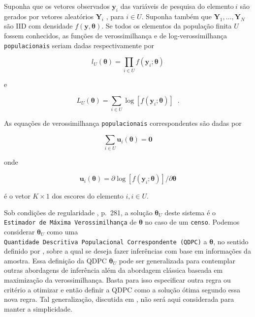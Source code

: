 \documentclass[]{book}
\numberwithin{example}{chapter}
\numberwithin{remark}{chapter}
\numberwithin{definition}{chapter}
\begin{document}
Suponha que os vetores observados \(\mathbf{y}_{i}\) das variáveis de
pesquisa do elemento\(\ i\) são gerados por vetores aleatórios
\(\mathbf{Y}_{i}\) , para \(i\in U\). Suponha também que
\(\mathbf{Y}_{1},\ldots ,\mathbf{Y}_{N}\) são IID com densidade
\(f\left( \mathbf{y},\mathbf{\theta }\right)\). Se todos os elementos da
população finita \(U\) fossem conhecidos, as funções de verossimilhança
e de log-verossimilhança \texttt{populacionais} seriam dadas
respectivamente por

\begin{equation}
l_{U}\left( \mathbf{\theta }\right) =\prod\limits_{i\in U}f\left( \mathbf{y}
_{i};\mathbf{\theta }\right)  
\label{eq:modpar3}
\end{equation}

e

\begin{equation}
L_{U}\left( \mathbf{\theta }\right) =\sum_{i\in U}\log \left[ f\left( 
\mathbf{y}_{i};\mathbf{\theta }\right) \right] \;\;.  
\label{eq:modpar4}
\end{equation}

As equações de verossimilhança \texttt{populacionais} correspondentes
são dadas por

\begin{equation}
\sum_{i\in U}\mathbf{u}_{i}\left( \mathbf{\theta }\right) =\mathbf{0}
\label{eq:modpar5}
\end{equation}

onde

\begin{equation}
\mathbf{u}_{i}\left( \mathbf{\theta }\right) =\partial \log \left[ f\left( 
\mathbf{y}_{i};\mathbf{\theta }\right) \right] /\partial \mathbf{\theta }
\label{eq:modpar6}
\end{equation}

é o vetor \(K\times 1\) dos escores do elemento \(i,i\in U\).

Sob condições de regularidade \citep{cox}, p.~281, a solução
\(\mathbf{\theta }_{U}\) deste sistema é o
\texttt{Estimador\ de\ Máxima\ Verossimilhança} de \(\mathbf{\theta }\)
no caso de um \texttt{censo}. Podemos considerar
\(\mathbf{\theta }_{U}\) como uma
\texttt{Quantidade\ Descritiva\ Populacional\ Correspondente\ (QDPC)} a
\(\mathbf{\theta }\), no sentido definido por \citep{Pfeff}, sobre a
qual se deseja fazer inferências com base em informações da amostra.
Essa definição da QDPC \(\mathbf{\theta }_{U}\) pode ser generalizada
para contemplar outras abordagens de inferência além da abordagem
clássica baseada em maximização da verossimilhança. Basta para isso
especificar outra regra ou critério a otimizar e então definir a QDPC
como a solução ótima segundo essa nova regra. Tal generalização,
discutida em \citep{Pfeff}, não será aqui considerada para manter a
simplicidade.
\end{document}
